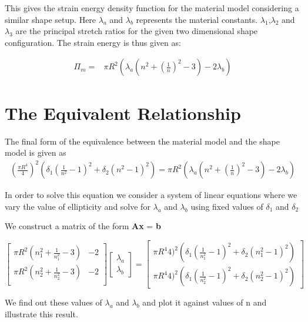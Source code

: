 \documentclass[idxtotoc,hyperref,openany]{labbook} %
\begin{document}
This gives the strain energy density function for the material model considering a similar shape setup. Here $\lambda_a$ and $\lambda_b$ represents the material constants. $\lambda_1$,$\lambda_2$ and $\lambda_3$ are the principal stretch ratios for the given two dimensional shape configuration. The strain energy is thus given as:

\begin{align}
\Pi_m = & \pi R^2 (\lambda_a(n^2 + (\frac{1}{n})^2 - 3) - 2 \lambda_b)
\end{align}

\section{The Equivalent Relationship}

The final form of the equivalence between the material model and the shape model is given as
\begin{align}
(\frac{\pi R^4}{4})^2(\delta_1 (\frac{1}{n^2}-1)^2 + \delta_2(n^2 - 1)^2) = \pi R^2 (\lambda_a(n^2 + (\frac{1}{n})^2 - 3) - 2 \lambda_b)
\end{align}

In order to solve this equation we consider a system of linear equations where we vary the value of ellipticity and solve for $\lambda_a$ and $\lambda_b$ using fixed values of $\delta_1$ and $\delta_2$

We construct a matrix of the form \textbf{A}\textbf{x} = \textbf{b}

\[
\begin{bmatrix}
	\pi R^2(n_1^2 + \frac{1}{n_1^2} - 3)   & -2 \\
	\pi R^2(n_2^2 + \frac{1}{n_2^2} - 3)
	& -2 \\
\end{bmatrix}
\begin{bmatrix}
\lambda_a \\
\lambda_b
\end{bmatrix}
=
\begin{bmatrix}
	{\pi R^4}{4})^2(\delta_1 (\frac{1}{n_1^2}-1)^2 + \delta_2(n_1^2 - 1)^2) \\
    {\pi R^4}{4})^2(\delta_1 (\frac{1}{n_2^2}-1)^2 + \delta_2(n_2^2 - 1)^2)
\end{bmatrix}
\]

We find out these values of $\lambda_a$ and $\lambda_b$ and plot it against values of n and illustrate this result.  


\end{document}
